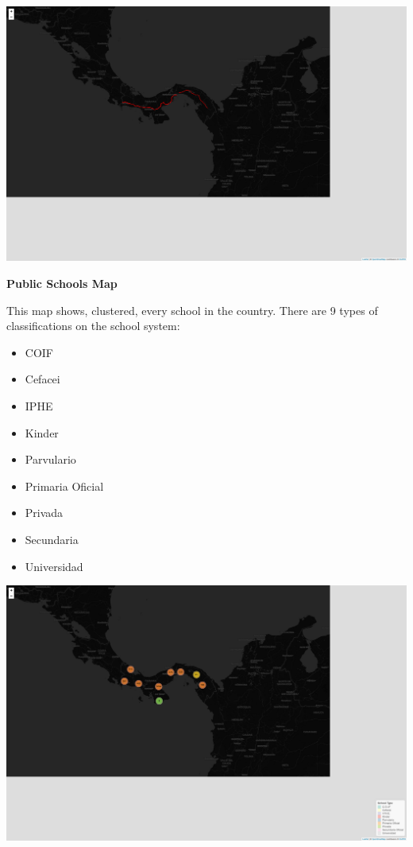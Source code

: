 \documentclass[
  letterpaper,
  DIV=11,
  numbers=noendperiod]{scrartcl}
\providecommand{\tightlist}{%
  \setlength{\itemsep}{0pt}\setlength{\parskip}{0pt}}\usepackage{longtable,booktabs,array}
\begin{document}
\includegraphics{index_files/figure-pdf/panama-highway-1.pdf}

\textbf{Public Schools Map}

This map shows, clustered, every school in the country. There are 9
types of classifications on the school system:

\begin{itemize}
\tightlist
\item
  COIF
\item
  Cefacei
\item
  IPHE
\item
  Kinder
\item
  Parvulario
\item
  Primaria Oficial
\item
  Privada
\item
  Secundaria
\item
  Universidad
\end{itemize}

\includegraphics{index_files/figure-pdf/schools-map-1.pdf}
\end{document}
